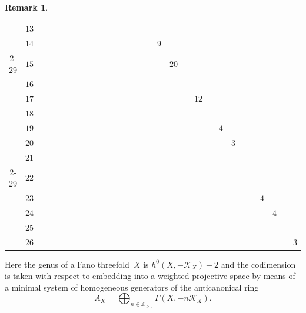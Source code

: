 \documentclass[10pt,a4paper]{amsart}
\theoremstyle{definition}
\newtheorem{rema}[thm]{Remark}
\def\ZZ{{\mathbb Z}}
\numberwithin{equation}{section}
\begin{document}
\begin{rema}
\begin{table}[h!]
\begin{longtable}{c|c|ccccc|ccccc|ccccc|ccccc|ccccc|cc}
	\\
	&${ 13}$ & & & & & & & & & & & & & & & & & & & & & & & & & & &
	\\
	&${ 14}$ & & & & & & & & & & & & & & & \hyperref[T(14,16)]{${ 9}$} & & & & & & & & & & & &
	\\
	\cline{2-29}
	&${ 15}$ & & & & & & & & & & & & & & & & \hyperref[T(15,17)]{${ 20}$} & & & & & & & & & & &
	\\
	&${ 16}$ & & & & & & & & & & & & & & & & & & & & & & & & & & &
	\\
	&${ 17}$ & & & & & & & & & & & & & & & & & & \hyperref[T(17,19)]{${ 12}$} & & & & & & & & &
	\\
	&${ 18}$ & & & & & & & & & & & & & & & & & & & & & & & & & & &
	\\
	&${ 19}$ & & & & & & & & & & & & & & & & & & & & \hyperref[T(19,21)]{${ 4}$} & & & & & & &
	\\
	&${ 20}$ & & & & & & & & & & & & & & & & & & & & & \hyperref[T(20,22)]{${ 3}$} & & & & & &
	\\
	&${ 21}$ & & & & & & & & & & & & & & & & & & & & & & & & & & &
	\\
	\cline{2-29}
	&${ 22}$ & & & & & & & & & & & & & & & & & & & & & & & & & & &
	\\
	&${ 23}$ & & & & & & & & & & & & & & & & & & & & & & & & \hyperref[T(23,25)]{${ 4}$} & & &
	\\
	&${ 24}$ & & & & & & & & & & & & & & & & & & & & & & & & & \hyperref[T(24,26)]{${ 4}$} & &
	\\
	&${ 25}$ & & & & & & & & & & & & & & & & & & & & & & & & & & &
	\\
	&${ 26}$ & & & & & & & & & & & & & & & & & & & & & & & & & & &\hyperref[T(26,28)]{${ 3}$}
	\\
	\hline
 \end{longtable}
\end{table}

\noindent
Here the genus of a Fano threefold~$X$ is $h^0(X,-\mathcal{K}_X)-2$
and the codimension is taken with respect to embedding into
a weighted projective space by means of a minimal system of
homogeneous generators of the anticanonical ring
\[
A_X = \bigoplus_{n \in \ZZ_{\ge 0}} \Gamma(X,-n\mathcal{K}_X).
\]
\end{rema}
\end{document}

